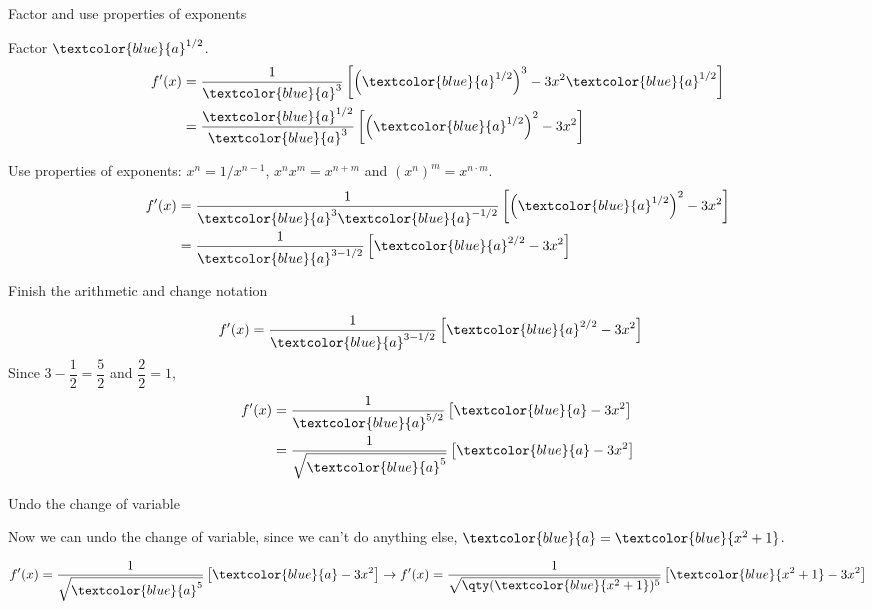 \documentclass[../tufte-style.tex]{standalone}
\begin{document}
\begin{frame}{Factor and use properties of exponents}

    Factor \(\textcolor{blue}{a}^{1/2}\).
    \begin{align*}
        f'(x) &= \frac{1}{\textcolor{blue}{a}^{3}}
              \left[\left(\textcolor{blue}{a}^{1/2}\right)^{3} - 3x^2\textcolor{blue}{a}^{1/2}
        \right] \\
              &= \frac{\textcolor{blue}{a}^{1/2}}{\textcolor{blue}{a}^{3}}
              \left[\left(\textcolor{blue}{a}^{1/2}\right)^{2} - 3x^2
        \right]
    \end{align*}

    Use properties of exponents: \(x^n = 1/x^{n-1}\), \(x^{n}x^{m}=x^{n+m}\) and \((x^{n})^{m}=x^{n\cdot m}\).
    \begin{align*}
        f'(x) &= \frac{1}{\textcolor{blue}{a}^{3}\textcolor{blue}{a}^{-1/2}}
        \left[\left(\textcolor{blue}{a}^{1/2}\right)^{2} - 3x^2\right] \\
              &= \frac{1}{\textcolor{blue}{a}^{3-1/2}}
        \left[\textcolor{blue}{a}^{2/2} - 3x^2\right]
    \end{align*}
\end{frame}

\begin{frame}{Finish the arithmetic and change notation}

    \begin{align*}
        f'(x) &= \frac{1}{\textcolor{blue}{a}^{3-1/2}}
        \left[\textcolor{blue}{a}^{2/2} - 3x^2\right]
    \end{align*}
    Since \( 3-\dfrac{1}{2} = \dfrac{5}{2} \) and \(\dfrac{2}{2}=1\),
    \begin{align*}
        f'(x) &= \frac{1}{\textcolor{blue}{a}^{5/2}}
        \left[\textcolor{blue}{a} - 3x^2\right] \\
              &= \frac{1}{\sqrt{\textcolor{blue}{a}^{5}}}
        \left[\textcolor{blue}{a} - 3x^2\right]
    \end{align*}
\end{frame}

\begin{frame}{Undo the change of variable}

    Now we can undo the change of variable, since we can't do anything else, \(\textcolor{blue}{a} = \textcolor{blue}{x^{2}+1}\).

    \begin{align*}
        f'(x) = \frac{1}{\sqrt{\textcolor{blue}{a}^{5}}}\left[\textcolor{blue}{a} - 3x^2\right] \to f'(x) = \frac{1}{\sqrt{\qty(\textcolor{blue}{x^{2}+1})^{5}}}\left[\textcolor{blue}{x^{2}+1} - 3x^2\right]
    \end{align*}
\end{frame}
\end{document}
